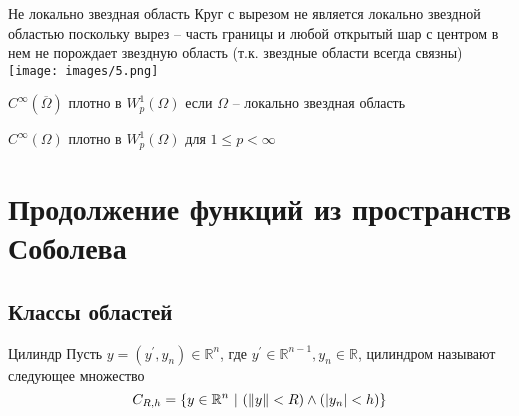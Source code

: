 \documentclass[12pt,a4paper]{article}
\newcommand{\Real}{\mathbb{R}}
\begin{document}
\begin{example}{Не локально звездная область}{}
	Круг с вырезом не является локально звездной областью поскольку вырез -- часть границы и любой открытый шар с центром в нем не порождает звездную область (т.к. звездные области всегда связны) \\
	\texttt{[image: images/5.png]}
\end{example}

\begin{theorem}{}{}
	$C^\infty (\overline{\Omega})$ плотно в $W_p^1 (\Omega)$ если $\Omega$ -- локально звездная область
\end{theorem}

\begin{theorem}{}{}
	$C^\infty (\Omega)$ плотно в $W_p^1 (\Omega)$ для $1 \leq p < \infty$
\end{theorem}

\section{Продолжение функций из пространств Соболева}

\subsection{Классы областей}

\begin{definition}{Цилиндр}{}
	Пусть $y = (y^\prime, y_n) \in \Real^n$, где $y^\prime \in \Real^{n-1}, y_n \in \Real$, цилиндром называют следующее множество
	\begin{equation*}
		C_{R, h} = \{ y \in \Real^n \ | \ (\norm{y} < R) \wedge (|y_n| < h) \}
	\end{equation*}
\end{definition}
\end{document}
